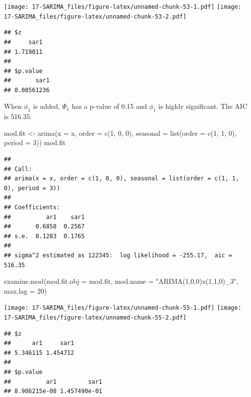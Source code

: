 \documentclass[
]{book}
\newenvironment{Shaded}{\begin{snugshade}}{\end{snugshade}}
\newcommand{\AttributeTok}[1]{\textcolor[rgb]{0.77,0.63,0.00}{#1}}
\newcommand{\DecValTok}[1]{\textcolor[rgb]{0.00,0.00,0.81}{#1}}
\newcommand{\FunctionTok}[1]{\textcolor[rgb]{0.00,0.00,0.00}{#1}}
\newcommand{\NormalTok}[1]{#1}
\newcommand{\OtherTok}[1]{\textcolor[rgb]{0.56,0.35,0.01}{#1}}
\newcommand{\StringTok}[1]{\textcolor[rgb]{0.31,0.60,0.02}{#1}}
\theoremstyle{definition}
\theoremstyle{definition}
\theoremstyle{definition}
\theoremstyle{definition}
\theoremstyle{remark}
\begin{document}
\texttt{[image: 17-SARIMA\_files/figure-latex/unnamed-chunk-53-1.pdf]} \texttt{[image: 17-SARIMA\_files/figure-latex/unnamed-chunk-53-2.pdf]}

\begin{verbatim}
## $z
##     sar1 
## 1.719011 
## 
## $p.value
##       sar1 
## 0.08561236
\end{verbatim}

When \(\phi_1\) is added, \(\Phi_1\) has a p-value of 0.15 and \(\phi_1\) is highly significant. The AIC is 516.35.

\begin{Shaded}
\begin{Highlighting}[]
\NormalTok{  mod.fit }\OtherTok{\textless{}{-}} \FunctionTok{arima}\NormalTok{(}\AttributeTok{x =}\NormalTok{ x, }\AttributeTok{order =} \FunctionTok{c}\NormalTok{(}\DecValTok{1}\NormalTok{, }\DecValTok{0}\NormalTok{, }\DecValTok{0}\NormalTok{), }\AttributeTok{seasonal =} \FunctionTok{list}\NormalTok{(}\AttributeTok{order =} \FunctionTok{c}\NormalTok{(}\DecValTok{1}\NormalTok{, }\DecValTok{1}\NormalTok{, }\DecValTok{0}\NormalTok{), }\AttributeTok{period =} \DecValTok{3}\NormalTok{))}
\NormalTok{  mod.fit}
\end{Highlighting}
\end{Shaded}

\begin{verbatim}
## 
## Call:
## arima(x = x, order = c(1, 0, 0), seasonal = list(order = c(1, 1, 0), period = 3))
## 
## Coefficients:
##          ar1    sar1
##       0.6858  0.2567
## s.e.  0.1283  0.1765
## 
## sigma^2 estimated as 122345:  log likelihood = -255.17,  aic = 516.35
\end{verbatim}

\begin{Shaded}
\begin{Highlighting}[]
\FunctionTok{examine.mod}\NormalTok{(}\AttributeTok{mod.fit.obj =}\NormalTok{ mod.fit, }\AttributeTok{mod.name =} \StringTok{"ARIMA(1,0,0)x(1,1,0)\_3"}\NormalTok{, }\AttributeTok{max.lag =} \DecValTok{20}\NormalTok{)}
\end{Highlighting}
\end{Shaded}

\texttt{[image: 17-SARIMA\_files/figure-latex/unnamed-chunk-55-1.pdf]} \texttt{[image: 17-SARIMA\_files/figure-latex/unnamed-chunk-55-2.pdf]}

\begin{verbatim}
## $z
##      ar1     sar1 
## 5.346115 1.454712 
## 
## $p.value
##          ar1         sar1 
## 8.986215e-08 1.457490e-01
\end{verbatim}
\end{document}
